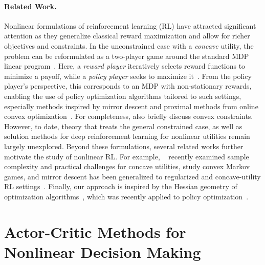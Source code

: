 \documentclass{article}
\theoremstyle{plain}
\theoremstyle{definition}
\theoremstyle{remark}
\begin{document}
\paragraph{Related Work.}
Nonlinear formulations of reinforcement learning (RL) have attracted significant attention as they generalize classical reward maximization and allow for richer objectives and constraints. 
In the unconstrained case with a \emph{concave} utility, the problem can be reformulated as a two-player game around the standard MDP linear program~\citep{zahavy2021reward}. 
Here, a \emph{reward player} iteratively selects reward functions to minimize a payoff, while a \emph{policy player} seeks to maximize it~\citep{Miryoosefi2019convexConstraints, hazan2019provably, nachum2020reinforcement, zhang2020variational, zahavy2021reward, geist2022concaveutilityreinforcementlearning}. 
From the policy player's perspective, this corresponds to an MDP with non-stationary rewards, enabling the use of policy optimization algorithms tailored to such settings, especially methods inspired by mirror descent and proximal methods from online convex optimization~\citep{shani20optimistic, tomar2022mirror, lan2023policy}.
For completeness, \cite{zahavy2021reward} also briefly discuss convex constraints. 
However, to date, theory that treats the general constrained case, as well as solution methods for deep reinforcement learning for nonlinear utilities remain largely unexplored.
Beyond these formulations, several related works further motivate the study of nonlinear RL. 
For example, ~\cite{mutti2023challengingcommonassumptionsconvex, moreno2025onlineepisodicconvexreinforcement, santos2025the} recently examined sample complexity and practical challenges for concave utilities, \cite{gemp2025convex} study convex Markov games, 
and mirror descent has been generalized to regularized and concave-utility RL settings~\citep{geist2022concaveutilityreinforcementlearning, zhan2023policymirrordescentregularized}. 
Finally, our approach is inspired by the Hessian geometry of optimization algorithms~\citep{duistermaat5hessian, alvarez2004hessian, raskutti2014informationgeometrymirrordescent}, which was recently applied to policy optimization~\citep{muller2023geometry, milosevic2024embedding, milosevic2025central}. 

\section{Actor-Critic Methods for Nonlinear Decision Making}
\end{document}
